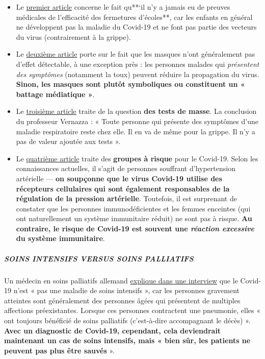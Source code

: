\begin{itemize}
\tightlist
\item
  Le
  \href{https://infekt.ch/2020/04/schulen-schliessen-hilfreich-oder-nicht/}{premier
  article} concerne le fait qu**`il n'y a jamais eu de preuves médicales
  de l'efficacité des fermetures d'écoles**, car les enfants en général
  ne développent pas la maladie du Covid-19 et ne font pas partie des
  vecteurs du virus (contrairement à la grippe).
\item
  Le
  \href{https://infekt.ch/2020/04/atemschutzmasken-fuer-alle-medienhype-oder-unverzichtbar/}{deuxième
  article} porte sur le fait que les masques n'ont généralement pas
  d'effet détectable, à une exception près : les personnes malades qui
  \emph{présentent des symptômes} (notamment la toux) peuvent réduire la
  propagation du virus. \textbf{Sinon, les masques sont plutôt
  symboliques ou constituent un « battage médiatique »}.
\item
  Le
  \href{https://infekt.ch/2020/04/corona-testen-testen-und-kein-ende/}{troisième
  article} traite de la question \textbf{des tests de masse}. La
  conclusion du professeur Vernazza : « Toute personne qui présente des
  symptômes d'une maladie respiratoire reste chez elle. Il en va de même
  pour la grippe. Il n'y a pas de valeur ajoutée aux tests ».
\item
  Le
  \href{https://infekt.ch/2020/03/immunschwaeche-und-schwangerschaft-kein-covid-19-risikofaktor/}{quatrième
  article} traite des \textbf{groupes à risque} pour le Covid-19. Selon
  les connaissances actuelles, il s'agit de personnes souffrant
  d'hypertension artérielle --- \textbf{on soupçonne que le virus
  Covid-19 utilise des récepteurs cellulaires qui sont également
  responsables de la régulation de la pression artérielle}. Toutefois,
  il est surprenant de constater que les personnes immunodéficientes et
  les femmes enceintes (qui ont naturellement un système immunitaire
  réduit) ne sont pas à risque. \textbf{Au contraire, le risque de
  Covid-19 est souvent une \emph{réaction excessive} du système
  immunitaire}.
\end{itemize}

\hypertarget{soins-intensifs-versus-soins-palliatifs}{%
\subparagraph{\texorpdfstring{\textbf{SOINS INTENSIFS VERSUS SOINS
PALLIATIFS}}{SOINS INTENSIFS VERSUS SOINS PALLIATIFS}}\label{soins-intensifs-versus-soins-palliatifs}}

Un médecin en soins palliatifs allemand
\href{https://www.ruhr24.de/ruhrgebiet/coronavirus-behandlung-intensivstation-nrw-lungenentzuendung-matthias-thoens-witten-zr-13645038.html}{explique
dans une interview} que le Covid-19 n'est « pas une maladie de soins
intensifs », car les personnes gravement atteintes sont généralement des
personnes âgées qui présentent de multiples affections préexistantes.
Lorsque ces personnes contractent une pneumonie, elles « ont toujours
bénéficié de soins palliatifs (c'est-à-dire accompagnant le décès) ».
\textbf{Avec un diagnostic de Covid-19, cependant, cela deviendrait
maintenant un cas de soins intensifs, mais « bien sûr, les patients ne
peuvent pas plus être sauvés} ».

